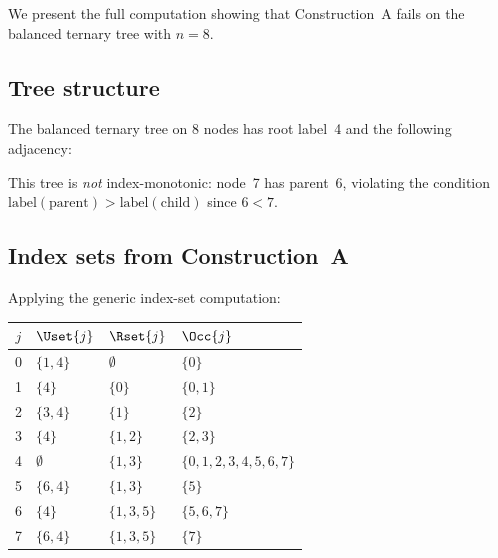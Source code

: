 
We present the full computation showing that Construction~A fails on
the balanced ternary tree with $n = 8$.

\subsection*{Tree structure}

The balanced ternary tree on 8 nodes has root label~4 and the
following adjacency:
\begin{center}
\end{center}

This tree is \emph{not} index-monotonic: node~7 has parent~6,
violating the condition $\text{label}(\text{parent}) >
\text{label}(\text{child})$ since $6 < 7$.

\subsection*{Index sets from Construction~A}

Applying the generic index-set computation:
\begin{center}
\begin{tabular}{@{}clll@{}}
\toprule
$j$ & $\Uset{j}$ & $\Rset{j}$ & $\Occ{j}$ \\
\midrule
0 & $\{1, 4\}$       & $\emptyset$     & $\{0\}$ \\
1 & $\{4\}$           & $\{0\}$         & $\{0, 1\}$ \\
2 & $\{3, 4\}$       & $\{1\}$         & $\{2\}$ \\
3 & $\{4\}$           & $\{1, 2\}$     & $\{2, 3\}$ \\
4 & $\emptyset$       & $\{1, 3\}$     & $\{0,1,2,3,4,5,6,7\}$ \\
5 & $\{6, 4\}$       & $\{1, 3\}$     & $\{5\}$ \\
6 & $\{4\}$           & $\{1, 3, 5\}$ & $\{5, 6, 7\}$ \\
7 & $\{6, 4\}$       & $\{1, 3, 5\}$ & $\{7\}$ \\
\bottomrule
\end{tabular}
\end{center}

